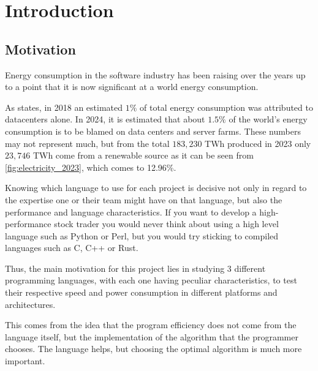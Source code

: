 \chapter{Introduction}\label{chap:introduction}



\section{Motivation}\label{sec:motivation}
Energy consumption in the software industry has been raising over the years up to a point that it is now significant at a world energy consumption. %

As \cite{recalibrating-datacenter} states, in 2018 an estimated $1\%$ of total energy consumption was attributed to datacenters alone. In 2024, it is estimated that about $1.5\%$ of the world's energy consumption is to be blamed on data centers and server farms. These numbers may not represent much, but from the total $183,230$ TWh produced in 2023 \cite{energy-production-consumption} only $23,746$ TWh come from a renewable source as it can be seen from \autoref{fig:electricity_2023}, which comes to 12.96\%.

Knowing which language to use for each project is decisive not only in regard to the expertise one or their team might have on that language, but also the performance and language characteristics. If you want to develop a high-performance stock trader you would never think about using a high level language such as Python or Perl, but you would try sticking to compiled languages such as C, C++ or Rust. 

Thus, the main motivation for this project lies in studying 3 different programming languages, with each one having peculiar characteristics, to test their respective speed and power consumption in different platforms and architectures. 

This comes from the idea that the program efficiency does not come from the language itself, but the implementation of the algorithm that the programmer chooses. The language helps, but choosing the optimal algorithm is much more important.

